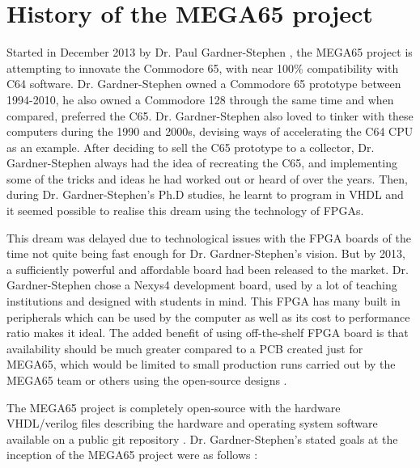 \section{History of the MEGA65 project}
\label{History of the MEGA65 project}
Started in December 2013 by Dr. Paul Gardner-Stephen 
\cite{RN44}, the MEGA65 project is attempting to innovate the Commodore 65, with near 100\% compatibility with C64 software. Dr. Gardner-Stephen owned a Commodore 65 prototype between 1994-2010, he also owned a Commodore 128 through the same time and when compared, preferred the C65. Dr. Gardner-Stephen also loved to tinker with these computers during the 1990 and 2000s, devising ways of accelerating the C64 CPU as an example. After deciding to sell the C65 prototype to a collector, Dr. Gardner-Stephen always had the idea of recreating the C65, and implementing some of the tricks and ideas he had worked out or heard of over the years. Then, during Dr. Gardner-Stephen's Ph.D studies, he learnt to program in VHDL and it seemed possible to realise this dream using the technology of FPGAs.

This dream was delayed due to technological issues with the FPGA boards of the time not quite being fast enough for Dr. Gardner-Stephen's vision. But by 2013, a sufficiently powerful and affordable board had been released to the market. Dr. Gardner-Stephen chose a Nexys4 development board, used by a lot of teaching institutions and designed with students in mind. This FPGA has many built in peripherals which can be used by the computer as well as its cost to performance ratio makes it ideal. The added benefit of using off-the-shelf FPGA board is that availability should be much greater compared to a PCB created just for MEGA65, which would be limited to small production runs carried out by the MEGA65 team or others using the open-source designs 
\cite{RN45}.

The MEGA65 project is completely open-source with the hardware VHDL/verilog files describing the hardware and operating system software available on a public git repository 
\cite{RN17}. Dr. Gardner-Stephen's stated goals at the inception of the MEGA65 project were as follows \cite{RN45}:

